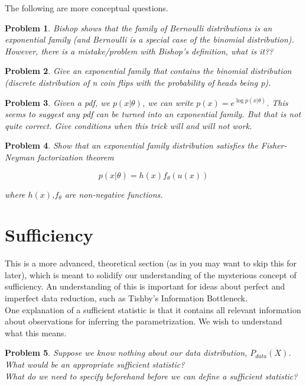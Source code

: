 \documentclass[a4paper]{article}
\newtheorem{problem}{Problem}[section]
\begin{document}
The following are more conceptual questions.

\begin{problem}
  Bishop shows that the family of Bernoulli distributions is an exponential family (and Bernoulli is a special case of the binomial distribution).  However, there is a mistake/problem with Bishop's definition, what is it??
\end{problem}

\begin{problem}
  Give an exponential family that contains the binomial distribution (discrete distribution of n coin flips with the probability of heads being p).
\end{problem}

\begin{problem}
  Given a pdf, we $p(x \vert \theta)$, we can write $p(x) = e^{\log p( x \vert \theta)}$.  This seems to suggest any pdf can be turned into an exponential family.  But that is not quite correct.  Give conditions when this trick will and will not work.
\end{problem}

\begin{problem}
Show that an exponential family distribution satisfies the Fisher-Neyman factorization theorem

\begin{equation}
  p(x \vert \theta) = h(x) f_\theta( u(x) )
  \label{}
\end{equation}

where $h(x)$,$f_\theta$ are non-negative functions.

\end{problem}


\section{Sufficiency}

This is a more advanced, theoretical section (as in you may want to skip this for later), which is meant to solidify our understanding of the mysterious concept of sufficiency.  An understanding of this is important for ideas about perfect and imperfect data reduction, such as Tishby's Information Bottleneck. \\


One explanation of a sufficient statistic is that it contains all relevant information about observations for inferring the parametrization.  We wish to understand what this means.

\begin{problem}
Suppose we know nothing about our data distribution, $P_{data}(X)$.  What would be an appropriate sufficient statistic?  \\
What do we need to specify beforehand before we can define a sufficient statistic?  
\end{problem}
\end{document}
